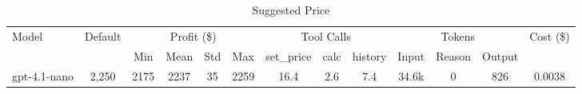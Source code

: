 \begin{table}[h]
\centering
\small
\caption{Suggested Price}
\begin{tabular}{|l|c|c|c|c|c|c|c|c|c|c|c|c|}
\hline
\multirow{2}{*}{Model} & \multirow{2}{*}{Default} & \multicolumn{4}{c|}{Profit (\$)} & \multicolumn{3}{c|}{Tool Calls} & \multicolumn{3}{c|}{Tokens} & \multirow{2}{*}{Cost (\$)} \\
\cline{3-12}
& & Min & Mean & Std & Max & set\_price & calc & history & Input & Reason & Output & \\
\hline
gpt-4.1-nano & 2,250 & 2175 & 2237 & 35 & 2259 & 16.4 & 2.6 & 7.4 & 34.6k & 0 & 826 & 0.0038 \\
\hline
\end{tabular}
\end{table}